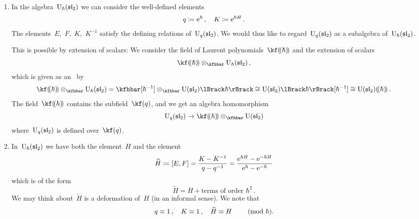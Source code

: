 \documentclass[a4paper, 11pt, oneside]{scrartcl}
\begin{document}
\begin{remark}
  \leavevmode
  \begin{enumerate}
    \item
      In the algebra~$\operatorname{U}_{\hbar}(\mathfrak{sl}_2)$ we can consider the well-defined elements
      \[
        q \coloneqq \mathrm{e}^{\hbar} \,,
        \quad
        K \coloneqq \mathrm{e}^{\hbar H} \,.
      \]
      The elements~$E$,~$F$,~$K$,~$K^{-1}$ satisfy the defining relations of~$\operatorname{U}_q(\mathfrak{sl}_2)$.
      We would thus like to regard~$\operatorname{U}_q(\mathfrak{sl}_2)$ as a subalgebra of~$\operatorname{U}_{\hbar}(\mathfrak{sl}_2)$.

      This is possible by extension of scalars:
      We consider the field of Laurent polynomials~$\lpower{\kf}{\hbar}$ and the extension of scalars
      \[
        \lpower{\kf}{\hbar} \tensor_{\kfhbar} \Univ_{\hbar}(\sllie_2) \,,
      \]
      which is given as an~\module{$\lpower{\kf}{\hbar}$} by
      \[
        \lpower{\kf}{\hbar} \tensor_{\kfhbar} \Univ_{\hbar}(\sllie_2)
        =
        \kfhbar[\hbar^{-1}] \tensor_{\kfhbar} \power{\Univ(\sllie_2)}{\hbar}
        \cong
        \power{\Univ(\sllie_2)}{\hbar}[\hbar^{-1}]
        \cong
        \lpower{\Univ(\sllie_2)}{\hbar} \,.
      \]
      The field~$\lpower{\kf}{\hbar}$ contains the subfield~$\kf(q)$, and we get an algebra homomorphism
      \[
        \Univ_q(\sllie_2)
        \to
        \lpower{\kf}{\hbar} \tensor_{\kfhbar} \Univ(\sllie_2)
      \]
      where~$\operatorname{U}_q(\mathfrak{sl}_2)$ is defined over~$\kf(q)$.
    \item
      In~$\operatorname{U}_{\hbar}(\mathfrak{sl}_2)$ we have both the element~$H$ and the element
      \[
        \widetilde{H}
        \coloneqq
        [E,F]
        =
        \frac{K - K^{-1}}{q - q^{-1}}
        =
        \frac{\mathrm{e}^{\hbar H} - \mathrm{e}^{-\hbar H}}{\mathrm{e}^{\hbar} - \mathrm{e}^{-\hbar}}
      \]
      which is of the form
      \[
        \widetilde{H}
        =
        H + \text{terms of order~$\hbar^2$} \,.
      \]
      We may think about~$\widetilde{H}$ is a deformation of~$H$ (in an informal sense).
      We note that
      \[
        q \equiv 1 \,,
        \quad
        K \equiv 1 \,,
        \quad
        \widetilde{H} \equiv H
        \qquad
        \ (\mathrm{mod}\ \hbar).
      \]
  \end{enumerate}
\end{remark}
\end{document}
